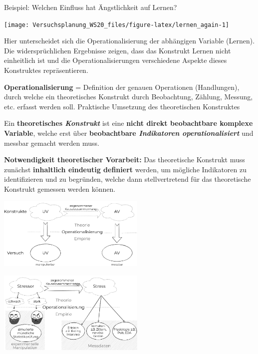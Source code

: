 \documentclass[
]{book}
\begin{document}
Beispiel: Welchen Einfluss hat Ängstlichkeit auf Lernen?

\begin{center}\texttt{[image: Versuchsplanung\_WS20\_files/figure-latex/lernen\_again-1]} \end{center}

Hier unterscheidet sich die Operationalisierung der abhängigen Variable (Lernen).
Die widersprüchlichen Ergebnisse zeigen, dass das Konstrukt Lernen nicht einheitlich ist und
die Operationalisierungen verschiedene Aspekte dieses Konstruktes repräsentieren.

\textbf{Operationalisierung} = Definition der genauen Operationen (Handlungen), durch
welche ein theoretisches Konstrukt durch Beobachtung, Zählung, Messung, etc.
erfasst werden soll. Praktische Umsetzung des theoretischen Konstruktes

Ein \textbf{theoretisches \emph{Konstrukt}} ist eine \textbf{nicht direkt beobachtbare komplexe Variable},
welche erst über \textbf{beobachtbare \emph{Indikatoren operationalisiert}} und messbar gemacht
werden muss.

\textbf{Notwendigkeit theoretischer Vorarbeit:} Das theoretische Konstrukt muss zunächst
\textbf{inhaltlich eindeutig definiert} werden, um mögliche Indikatoren zu identifizieren und
zu begründen, welche dann stellvertretend für das theoretische Konstrukt gemessen
werden können.

\begin{center}\includegraphics[width=200pt]{imgs/operartionalisierung} \end{center}

\begin{center}\includegraphics[width=200pt]{imgs/operartionalisierung_stress} \end{center}
\end{document}
